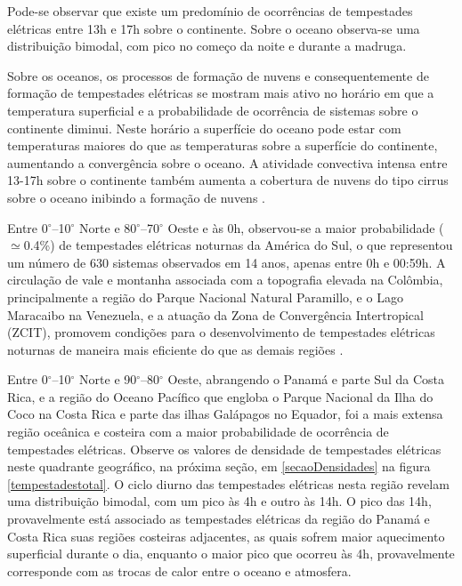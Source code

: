 Pode-se observar que existe um predomínio de ocorrências de tempestades elétricas entre 13h e 17h sobre o continente. Sobre o oceano observa-se  uma distribuição bimodal, com pico no começo da noite e durante a madruga.


Sobre os oceanos, os processos de formação de nuvens e consequentemente de formação de tempestades elétricas se mostram mais ativo no horário em que a temperatura superficial e a probabilidade de ocorrência de sistemas sobre o continente  diminui. Neste horário a superfície do oceano pode estar com temperaturas maiores do que as temperaturas sobre a superfície do continente, aumentando a convergência sobre o oceano. A atividade convectiva intensa entre 13-17h sobre o continente também aumenta a cobertura de nuvens do tipo cirrus sobre o oceano inibindo a formação de nuvens \cite{nesbitt2003diurnal}.



Entre 0$^{\circ}$--10$^{\circ}$ Norte e 80$^{\circ}$--70$^{\circ}$ Oeste e às 0h, observou-se a maior probabilidade ($\simeq$0.4\%) de tempestades elétricas noturnas da América do Sul, o que representou um número de 630 sistemas observados em 14 anos, apenas entre 0h e 00:59h. A circulação de vale e montanha associada com a topografia elevada na Colômbia, principalmente a região do Parque Nacional Natural Paramillo, e o Lago Maracaibo na Venezuela, e a atuação da Zona de Convergência Intertropical (ZCIT), promovem condições para o desenvolvimento de tempestades elétricas noturnas de maneira mais eficiente do que as demais regiões \cite{burgesser2012}.

Entre 0$^{\circ}$--10$^{\circ}$ Norte e 90$^{\circ}$--80$^{\circ}$ Oeste, abrangendo o Panamá e parte Sul da Costa Rica, e a região do Oceano Pacífico que engloba o Parque Nacional da Ilha do Coco na Costa Rica e parte das ilhas Galápagos no Equador, foi a mais extensa região oceânica e costeira com a maior probabilidade de ocorrência de tempestades elétricas. Observe os valores de densidade de tempestades elétricas neste quadrante geográfico, na próxima seção, em \ref{secaoDensidades} na figura \ref{tempestadestotal}. O ciclo diurno das tempestades elétricas nesta região revelam uma distribuição bimodal, com um pico às 4h e outro às 14h. O pico das 14h, provavelmente está associado as tempestades elétricas da região do Panamá e Costa Rica suas regiões costeiras adjacentes, as quais sofrem maior aquecimento superficial durante o dia, enquanto o maior pico que  ocorreu às 4h, provavelmente corresponde com as trocas de calor entre o oceano e atmosfera.

